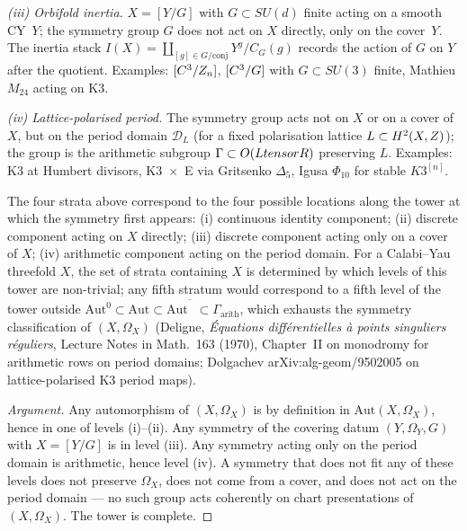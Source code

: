 \emph{(iii) Orbifold inertia.} $X = [Y/G]$ with
$G \subset SU(d)$ finite acting on a smooth CY~$Y$; the symmetry
group $G$ does not act on $X$ directly, only on the cover~$Y$.
The inertia stack $I(X) = \coprod_{[g] \in G/\text{conj}}
Y^g / C_G(g)$ records the action of $G$ on $Y$ after the quotient.
Examples: $[C^3/Z_n]$, $[C^3/G]$ with $G \subset SU(3)$
finite, Mathieu $M_{24}$ acting on K3.

\emph{(iv) Lattice-polarised period.} The symmetry group acts
not on $X$ or on a cover of $X$, but on the period domain
$\mathcal{D}_L$ (for a fixed polarisation lattice
$L \subset H^2(X, Z)$); the group is the arithmetic subgroup
$\Gamma \subset O(L tensor R)$ preserving $L$. Examples: K3 at
Humbert divisors, K3~$\times$~E via Gritsenko $\Delta_5$, Igusa
$\Phi_{10}$ for stable $K3^{[n]}$.

\begin{proposition}
\label{prop:four-strata-exhaust}
\ClaimStatusProposition
The four strata above correspond to the four possible locations
along the tower at which the symmetry first appears:
(i) continuous identity component; (ii) discrete component acting
on $X$ directly; (iii) discrete component acting only on a cover
of $X$; (iv) arithmetic component acting on the period domain.
For a Calabi--Yau threefold $X$, the set of strata containing $X$
is determined by which levels of this tower are non-trivial; any
fifth stratum would correspond to a fifth level of the tower
outside $\mathrm{Aut}^0 \subset \mathrm{Aut} \subset
\mathrm{Aut}^{\widetilde{\phantom{X}}} \subset
\Gamma_{\mathrm{arith}}$, which exhausts the symmetry
classification of $(X, \Omega_X)$ (Deligne, \emph{Équations
différentielles à points singuliers réguliers}, Lecture Notes in
Math.~163 (1970), Chapter~II on monodromy for arithmetic rows
on period domains; Dolgachev arXiv:alg-geom/9502005 on
lattice-polarised K3 period maps).
\end{proposition}

\begin{proof}[Argument]
Any automorphism of $(X, \Omega_X)$ is by definition in
$\mathrm{Aut}(X, \Omega_X)$, hence in one of levels (i)--(ii).
Any symmetry of the covering datum $(Y, \Omega_Y, G)$ with $X =
[Y/G]$ is in level (iii). Any symmetry acting only on the period
domain is arithmetic, hence level (iv). A symmetry that does not
fit any of these levels does not preserve $\Omega_X$, does not
come from a cover, and does not act on the period domain --- no
such group acts coherently on chart presentations of $(X,
\Omega_X)$. The tower is complete.
\end{proof}

